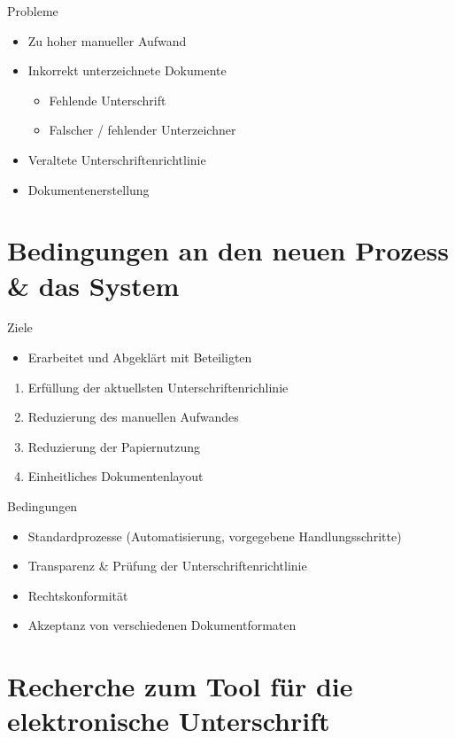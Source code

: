 \documentclass[utf8, xcolor, usenames,dvipsnames, aspectratio=169, notes, ]{beamer}
\begin{document}
\begin{frame}{Probleme}
	\begin{itemize}
		\item Zu hoher manueller Aufwand	
		\item Inkorrekt unterzeichnete Dokumente 
		\begin{itemize}
			\item Fehlende Unterschrift
			\item Falscher / fehlender Unterzeichner
		\end{itemize}
		\item Veraltete Unterschriftenrichtlinie
		\item Dokumentenerstellung
	\end{itemize}
\end{frame}

\section{Bedingungen an den neuen Prozess \& das System}
\begin{frame}{Ziele}
	\begin{itemize}
		\item Erarbeitet und Abgeklärt mit Beteiligten
	\end{itemize}
	\begin{enumerate}
		\item Erfüllung der aktuellsten Unterschriftenrichlinie
		\item Reduzierung des manuellen Aufwandes
		\item Reduzierung der Papiernutzung
		\item Einheitliches Dokumentenlayout
	\end{enumerate}
\end{frame}

\begin{frame}{Bedingungen}
	\begin{itemize}
		\item Standardprozesse (Automatisierung, vorgegebene Handlungsschritte)
		\item Transparenz \& Prüfung der Unterschriftenrichtlinie
		\item Rechtskonformität
		\item Akzeptanz von verschiedenen Dokumentformaten
	\end{itemize}
\end{frame}

\section{Recherche zum Tool für die elektronische Unterschrift}
\end{document}
